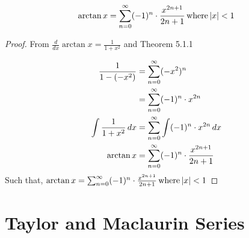 \begin{lemma}
  \[
    \arctan{x} = \sum_{n=0}^{\infty} (-1)^n \cdot \frac{x^{2n+1}}{2n+1} \, \mathrm{where} \, |x| < 1
  \]
\end{lemma}

\begin{proof}
  From \(\frac{d}{dx} \arctan{x} = \frac{1}{1+x^2}\) and Theorem 5.1.1

  \begin{equation}
    \nonumber
    \begin{aligned}
      \frac{1}{1 - (-x^2)} &= \sum_{n=0}^{\infty} (-x^2)^n \\
      &= \sum_{n=0}^{\infty} (-1)^n \cdot x^{2n} \\
      \int \frac{1}{1 + x^2} \, dx &= \sum_{n=0}^{\infty} \int (-1)^n \cdot x^{2n} \, dx \\
      \arctan{x} &= \sum_{n=0}^{\infty} (-1)^n \cdot \frac{x^{2n+1}}{2n+1}
    \end{aligned}
  \end{equation}
  Such that, \(\arctan{x} = \sum_{n=0}^{\infty} (-1)^n \cdot \frac{x^{2n+1}}{2n+1} \, \mathrm{where} \, |x| < 1 \)
\end{proof}


\section{Taylor and Maclaurin Series}

